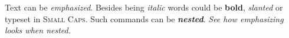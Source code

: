 \documentclass{article}
\begin{document}
Text can be \emph{emphasized}.
Besides being \textit{italic} words could be \textbf{bold},
\textsl{slanted} or typeset in \textsc{Small Caps}.
Such commands can be \textit{\textbf{nested}}.
\emph{See how \emph{emphasizing} looks when nested.}
\end{document}
